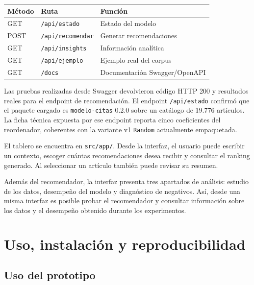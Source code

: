 \documentclass[9pt]{article}
\begin{document}
\begin{center}
\footnotesize
\begin{tabular}{lll}
\toprule
\textbf{Método} & \textbf{Ruta} & \textbf{Función} \\
\midrule
GET  & \texttt{/api/estado} & Estado del modelo \\
POST & \texttt{/api/recomendar} & Generar recomendaciones \\
GET  & \texttt{/api/insights} & Información analítica \\
GET  & \texttt{/api/ejemplo} & Ejemplo real del corpus \\
GET  & \texttt{/docs} & Documentación Swagger/OpenAPI \\
\bottomrule
\end{tabular}
\end{center}

Las pruebas realizadas desde Swagger devolvieron código HTTP 200 y resultados
reales para el endpoint de recomendación. El endpoint
\texttt{/api/estado} confirmó que el paquete cargado es
\texttt{modelo-citas} 0.2.0 sobre un catálogo de 19.776 artículos. La ficha
técnica expuesta por ese endpoint reporta cinco coeficientes del reordenador,
coherentes con la variante v1 \texttt{Random} actualmente empaquetada.

El tablero se encuentra en \texttt{src/app/}. Desde la interfaz, el usuario
puede escribir un contexto, escoger cuántas recomendaciones desea recibir y
consultar el ranking generado. Al seleccionar un artículo también puede revisar
su resumen.

Además del recomendador, la interfaz presenta tres apartados de análisis:
estudio de los datos, desempeño del modelo y diagnóstico de negativos. Así,
desde una misma interfaz es posible probar el recomendador y consultar
información sobre los datos y el desempeño obtenido durante los experimentos.


\section{Uso, instalación y reproducibilidad}

\subsection{Uso del prototipo}
\end{document}
